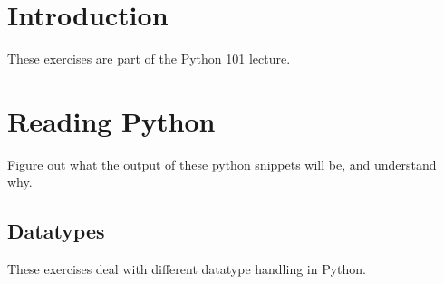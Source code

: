 \documentclass[draft=false]{article}
\begin{document}
\thispagestyle{empty}


\section*{Introduction}

These exercises are part of the Python 101 lecture.

\section{Reading Python}

Figure out what the output of these python snippets will be, and understand why.

\setlength{\columnsep}{3em}

\subsection{Datatypes}

These exercises deal with different datatype handling in Python.
\end{document}
